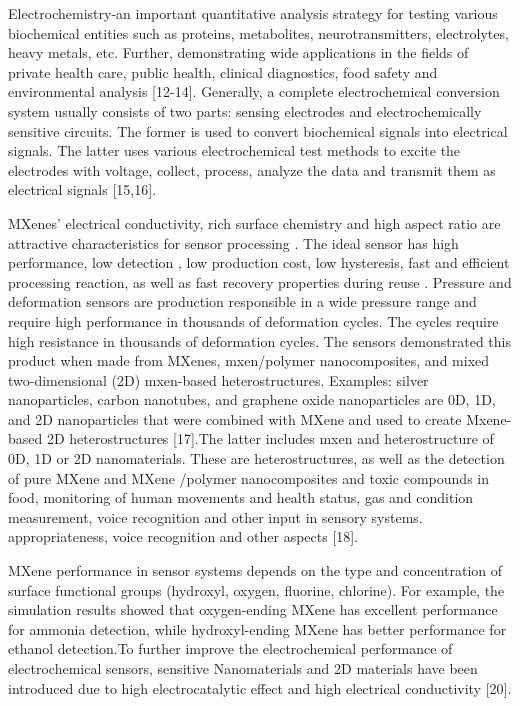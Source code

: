 \begin{multicols}{2}
Electrochemistry-an important quantitative analysis strategy for
testing various biochemical entities such as proteins,
metabolites, neurotransmitters, electrolytes, heavy metals, etc.
Further, demonstrating wide applications in the fields of private
health care, public health, clinical diagnostics, food safety
and environmental analysis {[}12-14{]}. Generally, a complete
electrochemical conversion system usually consists of two parts:
sensing electrodes and electrochemically sensitive circuits. The
former is used to convert biochemical signals into electrical
signals. The latter uses various electrochemical test methods to
excite the electrodes with voltage, collect, process, analyze
the data and transmit them as electrical signals {[}15,16{]}.

MXenes'{} electrical conductivity, rich surface
chemistry and high aspect ratio are attractive characteristics
for sensor processing . The ideal sensor has high performance,
low detection , low production cost, low hysteresis, fast and
efficient processing reaction, as well as fast recovery
properties during reuse . Pressure and deformation sensors are
production responsible in a wide pressure range and require high
performance in thousands of deformation cycles. The cycles
require high resistance in thousands of deformation cycles. The
sensors demonstrated this product when made from MXenes,
mxen/polymer nanocomposites, and mixed two-dimensional (2D)
mxen-based heterostructures. Examples: silver nanoparticles,
carbon nanotubes, and graphene oxide nanoparticles are 0D, 1D,
and 2D nanoparticles that were combined with MXene and used to
create Mxene-based 2D heterostructures {[}17{]}.The latter
includes mxen and heterostructure of 0D, 1D or 2D nanomaterials.
These are heterostructures, as well as the detection of pure
MXene and MXene /polymer nanocomposites and toxic compounds in
food, monitoring of human movements and health status, gas and
condition measurement, voice recognition and other input in
sensory systems. appropriateness, voice recognition and other
aspects {[}18{]}.

MXene performance in sensor systems depends on the type and
concentration of surface functional groups (hydroxyl, oxygen,
fluorine, chlorine). For example, the simulation results showed
that oxygen-ending MXene has excellent performance for ammonia
detection, while hydroxyl-ending MXene has better performance
for ethanol detection.To further improve the electrochemical
performance of electrochemical sensors, sensitive Nanomaterials
and 2D materials have been introduced due to high
electrocatalytic effect and high electrical conductivity
{[}20{]}.


\end{multicols}
